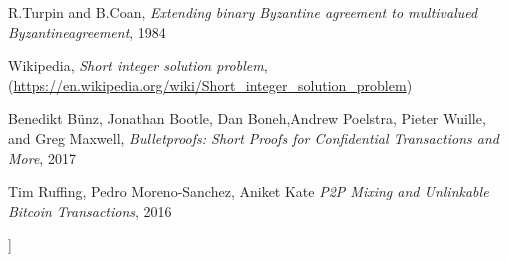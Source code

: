 \documentclass[a4paper,10pt,twocolumn]{article}
\begin{document}
\begin{@twocolumnfalse}
\begin{thebibliography}{99}
		R.Turpin and  B.Coan,
				\emph{Extending binary Byzantine agreement to multivalued Byzantineagreement}, 1984
		
		Wikipedia,
				\emph{Short integer solution problem}, (\url{https://en.wikipedia.org/wiki/Short_integer_solution_problem})
		
		Benedikt B\"{u}nz, Jonathan Bootle, Dan Boneh,Andrew Poelstra, Pieter Wuille, and Greg Maxwell,
				\emph{Bulletproofs: Short Proofs for Confidential Transactions and More}, 2017
		
		Tim Ruffing, Pedro Moreno-Sanchez, Aniket Kate
				\emph{P2P Mixing and Unlinkable Bitcoin Transactions}, 2016

					\end{thebibliography}
		\end{@twocolumnfalse}
]
	

	
\end{document}
